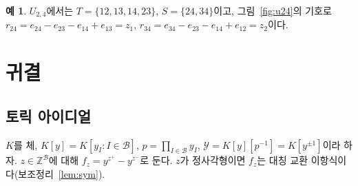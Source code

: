 \documentclass[11pt,a4paper]{article}
\theoremstyle{plain}
\theoremstyle{definition}
\newtheorem{example}[theorem]{예}
\newcommand{\Z}{\mathbb Z}
\newcommand{\bs}{\mathcal B}
\begin{document}
\begin{example}\label{ex:u24}
$U_{2,4}$에서는 $T=\{12,13,14,23\}$, $S=\{24,34\}$이고, 그림~\ref{fig:u24}의 기호로 $r_{24}=e_{24}-e_{23}-e_{14}+e_{13}=z_1$, $r_{34}=e_{34}-e_{23}-e_{14}+e_{12}=z_2$이다.
\end{example}


\section{귀결}\label{sec:apps}
\subsection{토릭 아이디얼}
$K$를 체, $K[y]=K[y_I:I\in\bs]$, $p=\prod_{I\in\bs}y_I$, $\mathcal Y=K[y][p^{-1}]=K[y^{\pm1}]$이라 하자. $z\in\Z^{\bs}$에 대해 $f_z=y^{z^+}-y^{z^-}$로 둔다. $z$가 정사각형이면 $f_z$는 대칭 교환 이항식이다(보조정리~\ref{lem:sym}).
\end{document}
